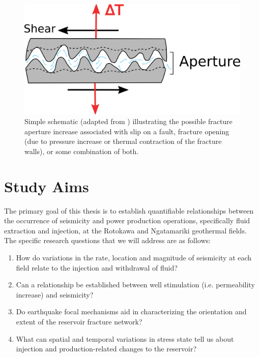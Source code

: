 \begin{figure}[h!]
\begin{center}
\includegraphics[width=0.70\columnwidth]{Chapter_1_Intro/figures/simple_stim_fig/simple_stim_fig}
\caption[Cartoon of fracture permeability increase]{{
Simple schematic (adapted from \protect\citet{Fang_2017}) illustrating the
possible fracture aperture increase associated with slip on a fault, fracture opening (due to pressure increase or thermal contraction of the fracture walls), or some combination of both.
{\label{363218}}%
}}
\end{center}
\end{figure}

\section{Study Aims}
The primary goal of this thesis is to establish quantifiable relationships between the occurrence of seismicity and power production operations, specifically fluid extraction and injection, at the Rotokawa and Ngatamariki geothermal fields. The specific research questions that we will address are as follows:

\begin{enumerate}
  \item{How do variations in the rate, location and magnitude of seismicity at each field relate to the injection and withdrawal of fluid?}
  \item{Can a relationship be established between well stimulation (i.e. \gls{permeability} increase) and seismicity?}
  \item{Do earthquake focal mechanisms aid in characterizing the orientation and extent of the reservoir fracture network?}
  \item{What can spatial and temporal variations in stress state tell us about injection and production-related changes to the reservoir?}
\end{enumerate}

